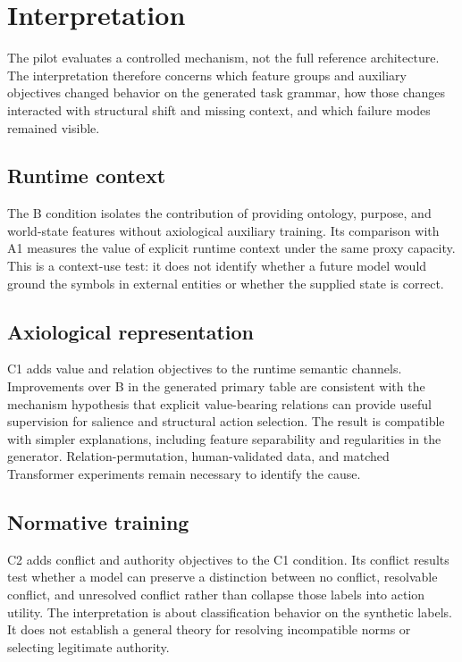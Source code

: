 \section{Interpretation}
\label{sec:interpretation}

The pilot evaluates a controlled mechanism, not the full reference architecture. The interpretation therefore concerns which feature groups and auxiliary objectives changed behavior on the generated task grammar, how those changes interacted with structural shift and missing context, and which failure modes remained visible.

\subsection{Runtime context}

The B condition isolates the contribution of providing ontology, purpose, and world-state features without axiological auxiliary training. Its comparison with A1 measures the value of explicit runtime context under the same proxy capacity. This is a context-use test: it does not identify whether a future model would ground the symbols in external entities or whether the supplied state is correct.

\subsection{Axiological representation}

C1 adds value and relation objectives to the runtime semantic channels. Improvements over B in the generated primary table are consistent with the mechanism hypothesis that explicit value-bearing relations can provide useful supervision for salience and structural action selection. The result is compatible with simpler explanations, including feature separability and regularities in the generator. Relation-permutation, human-validated data, and matched Transformer experiments remain necessary to identify the cause.

\subsection{Normative training}

C2 adds conflict and authority objectives to the C1 condition. Its conflict results test whether a model can preserve a distinction between no conflict, resolvable conflict, and unresolved conflict rather than collapse those labels into action utility. The interpretation is about classification behavior on the synthetic labels. It does not establish a general theory for resolving incompatible norms or selecting legitimate authority.

